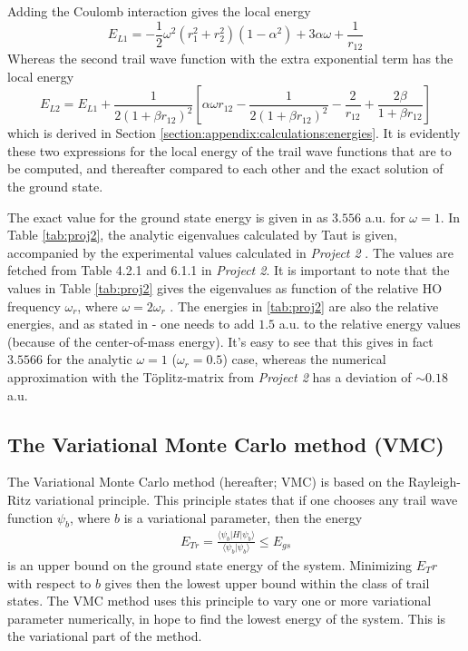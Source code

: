 \documentclass[12pt,english,a4paper]{article}
\begin{document}
Adding the Coulomb interaction gives the local energy
\begin{equation}
    E_{L1}=-\frac{1}{2}\omega^2\left(r_1^2+r_2^2\right)\left(1-\alpha^2\right)+3\alpha\omega+\frac{1}{r_{12}}
    \label{eq:local_energy_coulomb_t1}
\end{equation}
Whereas the second trail wave function with the extra exponential term has the local energy
\begin{equation}
    E_{L2}=E_{L1} + \frac{1}{2\left(1+\beta r_{12}\right)^2}\left[\alpha\omega r_{12}-\frac{1}{2\left(1+\beta r_{12}\right)^2}-\frac{2}{r_{12}}+\frac{2\beta}{1+\beta r_{12}}\right]
    \label{eq:local_energy_coulomb_t2}
\end{equation}
which is derived in Section \ref{section:appendix:calculations:energies}. It is evidently these two expressions for the local energy of the trail wave functions that are to be computed, and thereafter compared to each other and the exact solution of the ground state.

The exact value for the ground state energy is given in \cite{proj5} as $3.556$ a.u. for $\omega = 1$. In Table \ref{tab:proj2}, the analytic eigenvalues calculated by Taut \cite{Taut} is given, accompanied by the experimental values calculated in \textit{Project 2} \cite{GitHub}. The values are fetched from Table 4.2.1 and 6.1.1 in \textit{Project 2}. It is important to note that the values in Table \ref{tab:proj2} gives the eigenvalues as function of the relative HO frequency $\omega_r$, where $\omega = 2\omega_r$ \cite{Taut}. The energies in \ref{tab:proj2} are also the relative energies, and as stated in \cite{proj5} - one needs to add $1.5$ a.u. to the relative energy values (because of the center-of-mass energy). It's easy to see that this gives in fact $3.5566$ for the analytic  $\omega = 1$ ($\omega_r =0.5$) case, whereas the numerical approximation with the Töplitz-matrix from \textit{Project 2} has a deviation of $\sim 0.18$ a.u.

\subsection{The Variational Monte Carlo method (VMC)} \label{section:theory:VMC}
The Variational Monte Carlo method (hereafter; VMC) is based on the Rayleigh-Ritz variational principle. This principle states that if one chooses any trail wave function $\psi_{b}$, where $b$ is a variational parameter, then the energy
\begin{align*}
    E_{Tr}=\frac{\langle\psi_{b}|H|\psi_{b}\rangle}{\langle\psi_{b}|\psi_{b}\rangle}\le E_{gs}
\end{align*}
is an upper bound on the ground state energy of the system. Minimizing $E_Tr$ with respect to $b$ gives then the lowest upper bound within the class of trail states. The VMC method uses this principle to vary one or more variational parameter numerically, in hope to find the lowest energy of the system. This is the variational part of the method. 
\end{document}
